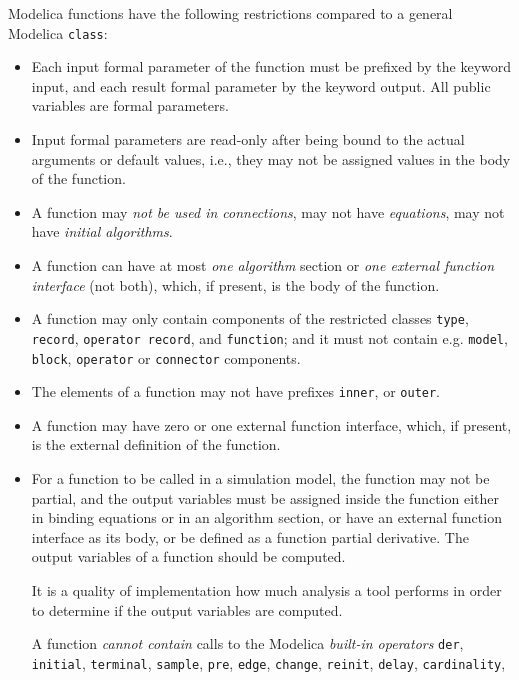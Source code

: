 Modelica functions have the following restrictions compared to a general
Modelica \lstinline!class!:
\begin{itemize}
\item
  Each input formal parameter of the function must be prefixed by the
  keyword input, and each result formal parameter by the keyword output.
  All public variables are formal parameters.
\item
  Input formal parameters are read-only after being bound to the actual
  arguments or default values, i.e., they may not be assigned values in
  the body of the function.
\item
  A function may \emph{not be used in connections}, may not have
  \emph{equations}, may not have \emph{initial algorithms}.
\item
  A function can have at most \emph{one algorithm} section or \emph{one
  external function interface} (not both), which, if present, is the
  body of the function.
\item
  A function may only contain components of the restricted classes
  \lstinline!type!, \lstinline!record!, \lstinline!operator record!, and \lstinline!function!;
  and it must not contain e.g.
  \lstinline!model!, \lstinline!block!, \lstinline!operator! or \lstinline!connector!
  components.
\item
  The elements of a function may not have prefixes \lstinline!inner!, or \lstinline!outer!.
\item
  A function may have zero or one external function interface, which, if
  present, is the external definition of the function.
\item
  For a function to be called in a simulation model, the function may
  not be partial, and the output variables must be assigned inside the
  function either in binding equations or in an algorithm section,
  or have an external function interface as its body, or be defined as a
  function partial derivative. The output variables of a function should
  be computed.
  \begin{nonnormative}
  It is a quality of implementation how much analysis a tool performs in order to determine if the output variables are computed.
  \end{nonnormative}
  A function \emph{cannot contain} calls to the
  Modelica \emph{built-in operators} \lstinline!der!, \lstinline!initial!,
	\lstinline!terminal!, \lstinline!sample!,
  \lstinline!pre!, \lstinline!edge!, \lstinline!change!,
	\lstinline!reinit!, \lstinline!delay!, \lstinline!cardinality!,

\end{itemize}

